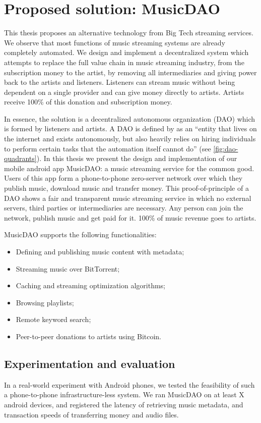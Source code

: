 {{\section{Proposed solution: MusicDAO}
This thesis proposes an alternative technology from Big Tech streaming services. We observe that most functions of music streaming systems are already completely automated.
We design and implement a decentralized system which attempts to replace the full value chain in music streaming industry, from the subscription money to the artist, by removing all intermediaries and giving power back to the artists and listeners. Listeners can stream music without being dependent on a single provider and can give money directly to artists. Artists receive 100\% of this donation and subscription money. %

In essence, the solution is a decentralized autonomous organization (DAO) which is formed by listeners and artists. A DAO is defined by \cite{buterin2014dao} as an ``entity that lives on the internet and exists autonomously, but also heavily relies on hiring individuals to perform certain tasks that the automation itself cannot do'' (see \ref{fig:dao-quadrants}). In this thesis we present the design and implementation of our mobile android app MusicDAO: a music streaming service for the common good. Users of this app form a phone-to-phone zero-server network over which they publish music, download music and transfer money. This proof-of-principle of a DAO shows a fair and transparent music streaming service in which no external servers, third parties or intermediaries are necessary. Any person can join the network, publish music and get paid for it. 100\% of music revenue goes to artists.

MusicDAO supports the following functionalities:
\begin{itemize}
    \item Defining and publishing music content with metadata;
    \item Streaming music over BitTorrent;
    \item Caching and streaming optimization algorithms;
    \item Browsing playlists;
    \item Remote keyword search;
    \item Peer-to-peer donations to artists using Bitcoin.
\end{itemize}

\subsection{Experimentation and evaluation}
In a real-world experiment with Android phones, we tested the feasibility of such a phone-to-phone infrastructure-less system. We ran MusicDAO on at least X android devices, and registered the latency of retrieving music metadata, and transaction speeds of transferring money and audio files. 

}}
